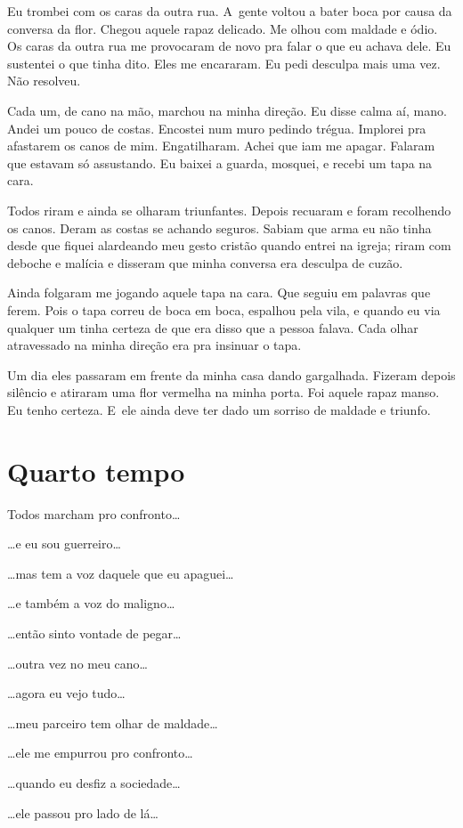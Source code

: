 Eu trombei com os caras da outra rua. A~gente voltou a bater boca por
causa da conversa da flor. Chegou aquele rapaz delicado. Me olhou com
maldade e ódio. Os caras da outra rua me provocaram de novo pra falar o
que eu achava dele. Eu sustentei o que tinha dito. Eles me encararam. Eu
pedi desculpa mais uma vez. Não resolveu.

Cada um, de cano na mão, marchou na minha direção. Eu disse calma aí,
mano. Andei um pouco de costas. Encostei num muro pedindo trégua.
Implorei pra afastarem os canos de mim. Engatilharam. Achei que iam me
apagar. Falaram que estavam só assustando. Eu baixei a guarda, mosquei,
e recebi um tapa na cara.

Todos riram e ainda se olharam triunfantes. Depois recuaram e foram
recolhendo os canos. Deram as costas se achando seguros. Sabiam que arma
eu não tinha desde que fiquei alardeando meu gesto cristão quando entrei
na igreja; riram com deboche e malícia e disseram que minha conversa era
desculpa de cuzão.

Ainda folgaram me jogando aquele tapa na cara. Que seguiu em palavras
que ferem. Pois o tapa correu de boca em boca, espalhou pela vila, e
quando eu via qualquer um tinha certeza de que era disso que a pessoa
falava. Cada olhar atravessado na minha direção era pra insinuar o tapa.

Um dia eles passaram em frente da minha casa dando gargalhada. Fizeram
depois silêncio e atiraram uma flor vermelha na minha porta. Foi aquele
rapaz manso. Eu tenho certeza. E~ele ainda deve ter dado um sorriso de
maldade e triunfo.

\section{Quarto tempo}

Todos marcham pro confronto…

…e eu sou guerreiro…

…mas tem a voz daquele que eu apaguei…

…e também a voz do maligno…

…então sinto vontade de pegar…

…outra vez no meu cano…

…agora eu vejo tudo…

…meu parceiro tem olhar de maldade…

…ele me empurrou pro confronto…

…quando eu desfiz a sociedade…

…ele passou pro lado de lá…

